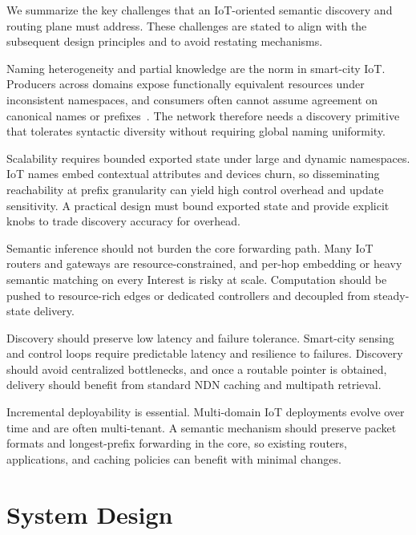 \documentclass[journal]{IEEEtran}
\begin{document}
We summarize the key challenges that an IoT-oriented semantic discovery and routing plane must address. These challenges are stated to align with the subsequent design principles and to avoid restating mechanisms.

Naming heterogeneity and partial knowledge are the norm in smart-city IoT. Producers across domains expose functionally equivalent resources under inconsistent namespaces, and consumers often cannot assume agreement on canonical names or prefixes~\cite{amadeo2025saf,dt_vndn_semantic}. The network therefore needs a discovery primitive that tolerates syntactic diversity without requiring global naming uniformity.

Scalability requires bounded exported state under large and dynamic namespaces. IoT names embed contextual attributes and devices churn, so disseminating reachability at prefix granularity can yield high control overhead and update sensitivity. A practical design must bound exported state and provide explicit knobs to trade discovery accuracy for overhead.

Semantic inference should not burden the core forwarding path. Many IoT routers and gateways are resource-constrained, and per-hop embedding or heavy semantic matching on every Interest is risky at scale. Computation should be pushed to resource-rich edges or dedicated controllers and decoupled from steady-state delivery.

Discovery should preserve low latency and failure tolerance. Smart-city sensing and control loops require predictable latency and resilience to failures. Discovery should avoid centralized bottlenecks, and once a routable pointer is obtained, delivery should benefit from standard NDN caching and multipath retrieval.

Incremental deployability is essential. Multi-domain IoT deployments evolve over time and are often multi-tenant. A semantic mechanism should preserve packet formats and longest-prefix forwarding in the core, so existing routers, applications, and caching policies can benefit with minimal changes.

\section{System Design}
\label{sec:design}
\end{document}
